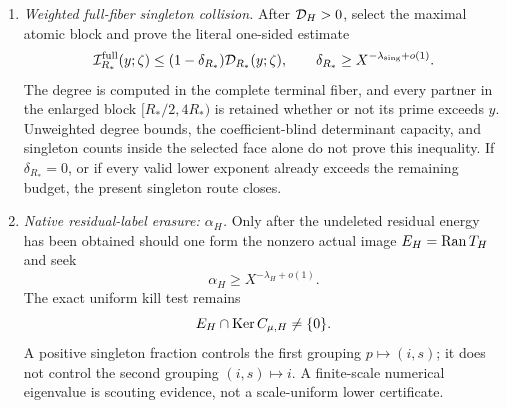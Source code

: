 \begin{enumerate}[label=\textbf{Door \Alph*.},leftmargin=3.8em]
 \item \emph{Weighted full-fiber singleton collision.}
       After \(\mathcal D_H>0\), select the maximal atomic block and prove the
       literal one-sided estimate
       \begin{equation}
        \mathcal I_{R_*}^{\rm full}(y;\zeta)
        \le(1-\delta_{R_*})\mathcal D_{R_*}(y;\zeta),
        \qquad
        \delta_{R_*}\ge X^{-\lambda_{\rm sing}+o(1)}.
        \label{eq:tpc59-next-weighted-singleton}
       \end{equation}
       The degree is computed in the complete terminal fiber, and every
       partner in the enlarged block \([R_*/2,4R_*)\) is retained whether
       or not its prime exceeds \(y\).  Unweighted degree bounds, the
       coefficient-blind determinant capacity, and singleton counts inside
       the selected face alone do not prove this inequality.  If
       \(\delta_{R_*}=0\), or if every valid lower exponent already exceeds
       the remaining budget, the present singleton route closes.

 \item \emph{Native residual-label erasure: \(\alpha_H\).}
       Only after the undeleted residual energy has been obtained should one
       form the nonzero actual image \(E_H=\operatorname{Ran} T_H\) and seek
       \begin{equation}
        \alpha_H\ge X^{-\lambda_H+o(1)}.
        \label{eq:tpc59-next-native-Gram}
       \end{equation}
       The exact uniform kill test remains
       \begin{equation}
        E_H\cap\operatorname{Ker} C_{\mu,H}\ne\{0\}.
        \label{eq:tpc59-next-native-kernel-kill}
       \end{equation}
       A positive singleton fraction controls the first grouping
       \(p\mapsto(i,s)\); it does not control the second grouping
       \((i,s)\mapsto i\).  A finite-scale numerical eigenvalue is scouting
       evidence, not a scale-uniform lower certificate.


\end{enumerate}
